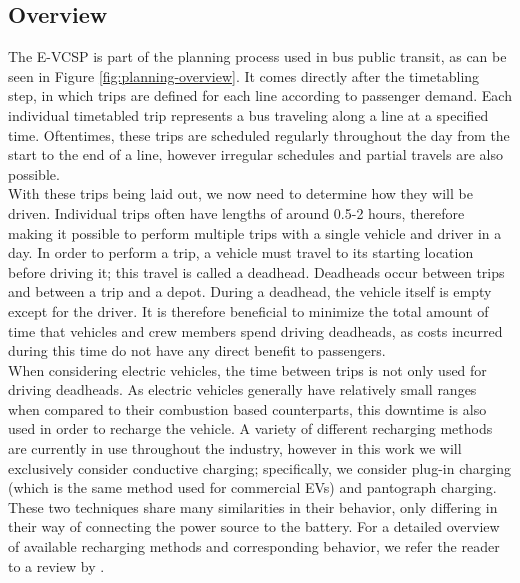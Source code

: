 \documentclass[]{article}
\begin{document}
\subsection{Overview}
The E-VCSP is part of the planning process used in bus public transit, as can be seen in Figure \ref{fig:planning-overview}. It comes directly after the timetabling step, in which trips are defined for each line according to passenger demand. Each individual timetabled trip represents a bus traveling along a line at a specified time. Oftentimes, these trips are scheduled regularly throughout the day from the start to the end of a line, however irregular schedules and partial travels are also possible. \\
With these trips being laid out, we now need to determine how they will be driven. Individual trips often have lengths of around 0.5-2 hours, therefore making it possible to perform multiple trips with a single vehicle and driver in a day. In order to perform a trip, a vehicle must travel to its starting location before driving it; this travel is called a deadhead. Deadheads occur between trips and between a trip and a depot. During a deadhead, the vehicle itself is empty except for the driver. It is therefore beneficial to minimize the total amount of time that vehicles and crew members spend driving deadheads, as costs incurred during this time do not have any direct benefit to passengers. \\
When considering electric vehicles, the time between trips is not only used for driving deadheads. As electric vehicles generally have relatively small ranges when compared to their combustion based counterparts, this downtime is also used in order to recharge the vehicle. A variety of different recharging methods are currently in use throughout the industry, however in this work we will exclusively consider conductive charging; specifically, we consider plug-in charging (which is the same method used for commercial EVs) and pantograph charging. These two techniques share many similarities in their behavior, only differing in their way of connecting the power source to the battery. For a detailed overview of available recharging methods and corresponding behavior, we refer the reader to a review by \citet{Zhou2024}. \\
\end{document}
